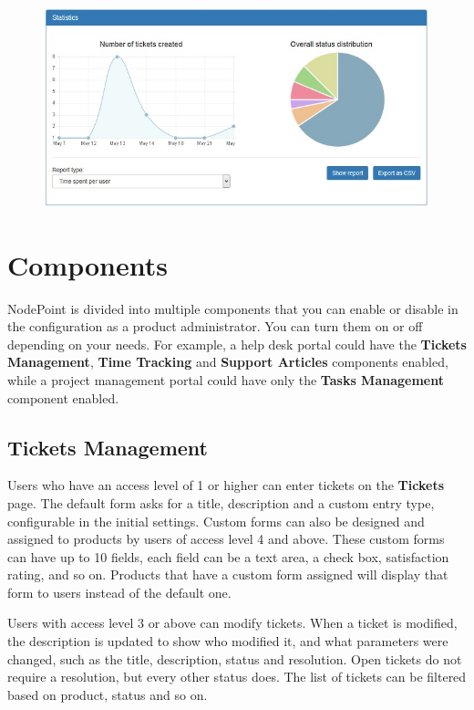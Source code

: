 \documentclass[11pt]{article}
\begin{document}
\begin{figure}[h]
\includegraphics{reports.jpg}
\end{figure}

\clearpage
\section{Components}
NodePoint is divided into multiple components that you can enable or disable in the configuration as a product administrator. You can turn them on or off depending on your needs. For example, a help desk portal could have the \textbf{Tickets Management}, \textbf{Time Tracking} and \textbf{Support Articles} components enabled, while a project management portal could have only the \textbf{Tasks Management} component enabled.

\subsection{Tickets Management}
Users who have an access level of 1 or higher can enter tickets on the \textbf{Tickets} page. The default form asks for a title, description and a custom entry type, configurable in the initial settings. Custom forms can also be designed and assigned to products by users of access level 4 and above. These custom forms can have up to 10 fields, each field can be a text area, a check box, satisfaction rating, and so on. Products that have a custom form assigned will display that form to users instead of the default one.

Users with access level 3 or above can modify tickets. When a ticket is modified, the description is updated to show who modified it, and what parameters were changed, such as the title, description, status and resolution. Open tickets do not require a resolution, but every other status does. The list of tickets can be filtered based on product, status and so on.
\end{document}
